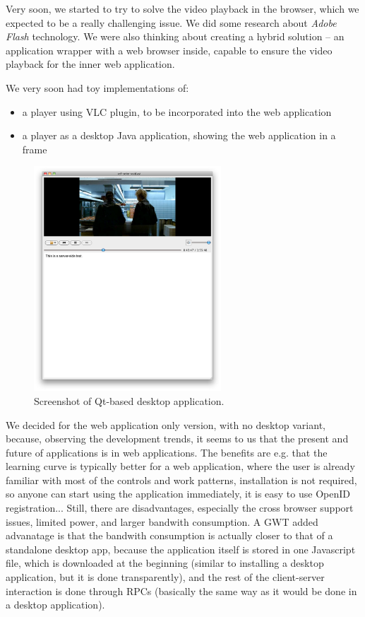 Very soon, we started to try to solve the video playback in the browser, which we expected to be a really challenging issue. We did some research about \emph{Adobe Flash} technology. We were also thinking about creating a hybrid solution -- an application wrapper with a web browser inside, capable to ensure the video playback for the inner web application.

We very soon had toy implementations of:

\begin{itemize}
\item a player using VLC plugin, to be incorporated into the web application

\item a player as a desktop Java application, showing the web application in a frame
\end{itemize}

\begin{figure}[h!]
	\centering
		\includegraphics[width=7cm]{figures/desktop-app-player.png}
	\caption{Screenshot of Qt-based desktop application.}
	\label{fig:figures_desktop-app-player}
\end{figure}

We decided for the web application only version, with no desktop variant, because, observing the development trends, it seems to us that the present and future of applications is in web applications. The benefits are e.g. that the learning curve is typically better for a web application, where the user is already familiar with most of the controls and work patterns, installation is not required, so anyone can start using the application immediately, it is easy to use OpenID registration...
Still, there are disadvantages, especially the cross browser support issues, limited power, and larger bandwith consumption.
A GWT added advanatage is that the bandwith consumption is actually closer to that of a standalone desktop app, because the application itself is stored in one Javascript file, which is downloaded at the beginning (similar to installing a desktop application, but it is done transparently), and the rest of the client-server interaction is done through RPCs (basically the same way as it would be done in a desktop application).

